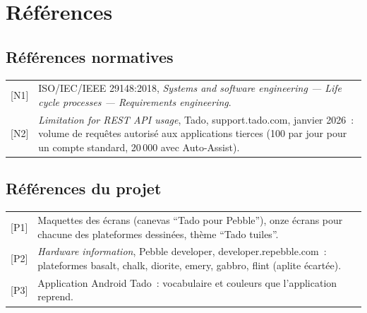 \section{Références}

\subsection*{Références normatives}

\begin{longtable}{@{}p{22mm}p{138mm}@{}}
  {[N1]} & ISO/IEC/IEEE 29148:2018, \textit{Systems and software engineering --- Life cycle processes --- Requirements engineering}. \\
  {[N2]} & \textit{Limitation for REST API usage}, Tado, support.tado.com, janvier 2026~: volume de requêtes autorisé aux applications tierces (100 par jour pour un compte standard, 20\,000 avec Auto-Assist). \\
\end{longtable}

\subsection*{Références du projet}

\begin{longtable}{@{}p{22mm}p{138mm}@{}}
  {[P1]} & Maquettes des écrans (canevas \enquote{Tado pour Pebble}), onze écrans pour chacune des plateformes dessinées, thème \enquote{Tado tuiles}. \\
  {[P2]} & \textit{Hardware information}, Pebble developer, developer.repebble.com~: plateformes basalt, chalk, diorite, emery, gabbro, flint (aplite écartée). \\
  {[P3]} & Application Android Tado~: vocabulaire et couleurs que l'application reprend. \\
\end{longtable}
